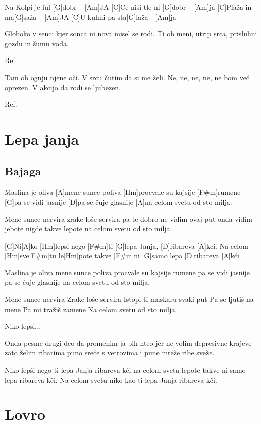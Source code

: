 \documentclass[a4paper,12pt]{article}
\begin{document}
\begin{multicols}{2}
\begin{guitar}
[C]Na Kolpi je ful [G]dobr – [Am]JA
[C]Ce nisi tle ni [G]dobr – [Am]ja
[C]Plaža in ma[G]saža – [Am]JA
[C]U kuhni pa sta[G]laža - [Am]ja


Globoko v senci kjer sonca ni
nova misel se rodi.
Ti ob meni, utrip srca,
prisluhni gozdu in šumu voda.


Ref.


Tam ob ognju njene oči.
V srcu čutim da si me želi.
Ne, ne, ne, ne, ne bom več oprezen.
V akcijo da rodi se ljubezen.


Ref.

\end{guitar}
\section{Lepa janja}
\subsection*{Bajaga}
\begin{guitar}
[D]Maslina je oliva [A]mene sunce poliva
[Hm]procvale su kajsije [F#m]rumene
[G]pa se vidi jasnije
[D]pa se čuje glasnije
[A]na celom svetu od sto milja.


Mene sunce nervira
zrake loše servira
pa te dobro ne vidim ovaj put
onda vidim jebote 
nigde takve lepote
na celom svetu od sto milja.


[G]Ni[A]ko [Hm]lepsi nego [F#m]ti
[G]lepa Janja, [D]ribareva [A]kci.
Na celom [Hm]sve[F#m]tu le[Hm]pote takve [F#m]ni
[G]samo lepa [D]ribareva [A]kči.


Maslina je oliva mene sunce poliva
procvale su kajsije rumene
pa se vidi jasnije
pa se čuje glasnije
na celom svetu od sto milja.


Mene sunce nervira
Zrake loše servira
Istopi ti maskaru svaki put
Pa se ljutiš na mene
Pa mi tražiš zamene
Na celom svetu od sto milja.
      

Niko lepsi...


Onda pesme drugi deo
da promenim ja bih hteo
jer ne volim depresivne krajeve
zato želim ribarima puno sreče s vetrovima
i pune mreže ribe sveže.


Niko lepši nego ti
lepa Janja ribareva kči
na celom svetu lepote takve ni
samo lepa ribareva kči.
Na celom svetu niko kao ti
lepa Janja ribareva kči. 

\end{guitar}
\section{Lovro}

\end{multicols}
\end{document}
